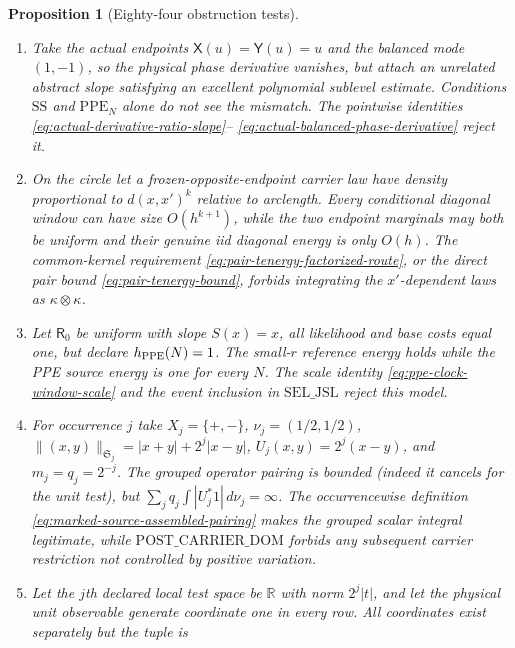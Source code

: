 \documentclass[11pt]{article}
\newtheorem{proposition}[theorem]{Proposition}
\begin{document}
\begin{proposition}[Eighty-four obstruction tests]
\begin{enumerate}[label=\textup{(T\arabic*)}]
      $\Phi_s(2s)=1$ but pointwise limit zero.  Uniform sup norm and
      branchwise pointwise convergence do not imply convergence of the
      pairing.  The common off-boundary BL modulus and convergence in
      \eqref{eq:moving-face-test-BL-convergence} reject this model.
\item Take the actual endpoints $\mathsf X(u)=\mathsf Y(u)=u$ and the
      balanced mode $(1,-1)$, so the physical phase derivative vanishes,
      but attach an unrelated abstract slope satisfying an excellent
      polynomial sublevel estimate.  Conditions $\mathrm{SS}$ and
      $\mathrm{PPE}_{N}$ alone do not see the mismatch.  The pointwise
      identities \eqref{eq:actual-derivative-ratio-slope}--
      \eqref{eq:actual-balanced-phase-derivative} reject it.
\item On the circle let a frozen-opposite-endpoint carrier law have density
      proportional to $d(x,x')^k$ relative to arclength.  Every conditional
      diagonal window can have size $O(h^{k+1})$, while the two endpoint
      marginals may both be uniform and their genuine iid diagonal energy is
      only $O(h)$.  The common-kernel requirement
      \eqref{eq:pair-tenergy-factorized-route}, or the direct pair bound
      \eqref{eq:pair-tenergy-bound}, forbids integrating the
      $x'$-dependent laws as $\kappa\otimes\kappa$.
\item Let $\mathsf R_0$ be uniform with slope $S(x)=x$, all likelihood and
      base costs equal one, but declare $h_{\rm PPE}(N)=1$.  The small-$r$
      reference energy holds while the PPE source energy is one for every
      $N$.  The scale identity \eqref{eq:ppe-clock-window-scale} and the
      event inclusion in $\mathrm{SEL\_JSL}$ reject this model.
\item For occurrence $j$ take $X_j=\{+,-\}$,
      $\nu_j=(1/2,1/2)$,
      $\|(x,y)\|_{\mathfrak S_j}=|x+y|+2^j|x-y|$,
      $U_j(x,y)=2^j(x-y)$, and $m_j=q_j=2^{-j}$.  The grouped operator
      pairing is bounded (indeed it cancels for the unit test), but
      $\sum_jq_j\int|U_j^*1|\,d\nu_j=\infty$.  The occurrencewise definition
      \eqref{eq:marked-source-assembled-pairing} makes the grouped scalar
      integral legitimate, while $\mathrm{POST\_CARRIER\_DOM}$ forbids any
      subsequent carrier restriction not controlled by positive variation.
\item Let the $j$th declared local test space be $\mathbb R$ with norm
      $2^j|t|$, and let the physical unit observable generate coordinate
      one in every row.  All coordinates exist separately but the tuple is

\end{enumerate}
\end{proposition}
\end{document}
